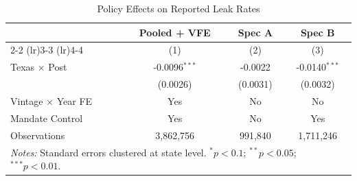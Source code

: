\begin{table}[htbp]
\centering
\caption{Policy Effects on Reported Leak Rates}
\label{tbl:leak-results}
\begin{tabular}{lccc}
\toprule
 & \textbf{Pooled + VFE} & \textbf{Spec A} & \textbf{Spec B} \\
\cmidrule(lr){2-2} \cmidrule(lr){3-3} \cmidrule(lr){4-4}
 & (1) & (2) & (3) \\
\midrule
Texas $\times$ Post & -0.0096$^{***}$ & -0.0022 & -0.0140$^{***}$ \\
& (0.0026) & (0.0031) & (0.0032) \\
\midrule
Vintage $\times$ Year FE & Yes & No & No \\
Mandate Control & Yes & No & Yes \\
\midrule
Observations & 3,862,756 & 991,840 & 1,711,246 \\
\bottomrule
\multicolumn{4}{p{0.9\textwidth}}{\footnotesize \textit{Notes:}
Standard errors clustered at state level.
$^{*}p<0.1$; $^{**}p<0.05$; $^{***}p<0.01$.}
\end{tabular}
\end{table}
